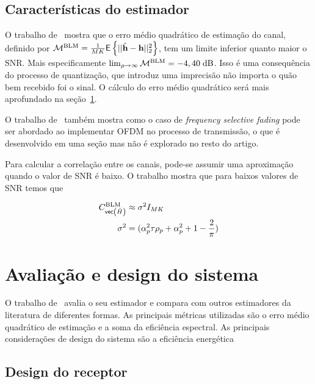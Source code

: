 \documentclass{article}
\newcommand{\dB}{\text{dB}}
\begin{document}
	\subsection{Características do estimador}

	O trabalho de~\cite{li.etal_2017a} mostra que o erro médio quadrático de estimação do canal, definido por $\mathcal{M}^{\text{BLM}}=\frac{1}{MK} \mathsf{E} \left\{ ||\hat{\mathbf{h}}-\mathbf{h}||^2_2 \right\} $, tem um limite inferior quanto maior o SNR. Mais especificamente $\lim_{\rho\to\infty}\Mcal^{\text{BLM}}=-4,40\;\dB$. Isso é uma consequência do processo de quantização, que introduz uma imprecisão não importa o quão bem recebido foi o sinal. O cálculo do erro médio quadrático será mais aprofundado na seção~\ref{sec:metricas_avaliacao}.
	
	O trabalho de~\cite{li.etal_2017a} também mostra como o caso de \textit{frequency selective fading} pode ser abordado ao implementar OFDM no processo de transmissão, o que é desenvolvido em uma seção mas não é explorado no resto do artigo.

	Para calcular a correlação entre os canais, pode-se assumir uma aproximação quando o valor de SNR é baixo. O trabalho mostra que para baixos valores de SNR temos que
	
	\begin{equation}
		\begin{split}
			C_{ \mathsf{vec} \left( \hat{H} \right) }^{\text{BLM}} & \approx\sigma^2I_{MK} \\ 
			\sigma^2 & = (\alpha_p^2\tau\rho_p+\alpha^2_p+1-\frac{2}{\pi})
		\end{split}
		\label{eq:aproximacao_covariancia_canal_baixo_snr}
	\end{equation}

	\section{Avaliação e design do sistema}
	\label{sec:metricas_avaliacao}

	O trabalho de~\cite{li.etal_2017a} avalia o seu estimador e compara com outros estimadores da literatura de diferentes formas. As principais métricas utilizadas são o erro médio quadrático de estimação e a soma da eficiência espectral. As principais considerações de design do sistema são a eficiência energética 

	\subsection{Design do receptor}
\end{document}
